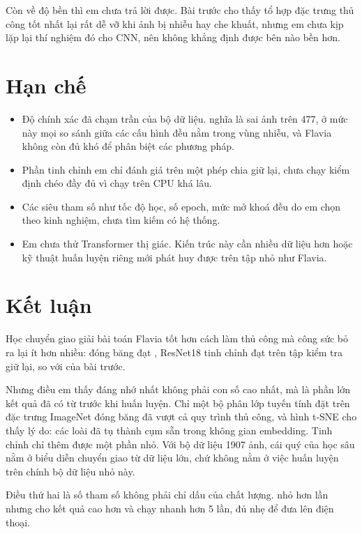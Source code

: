 \documentclass[11pt,a4paper]{article}
\begin{document}
Còn về độ bền thì em chưa trả lời được. Bài trước cho thấy tổ hợp đặc trưng thủ công tốt nhất lại
rất dễ vỡ khi ảnh bị nhiễu hay che khuất, nhưng em chưa kịp lặp lại thí nghiệm đó cho CNN, nên không
khẳng định được bên nào bền hơn.

\section{Hạn chế}

\begin{itemize}
  \item Độ chính xác đã chạm trần của bộ dữ liệu. \ftacc{} nghĩa là sai \fterrors{} ảnh trên 477, ở
        mức này mọi so sánh giữa các cấu hình đều nằm trong vùng nhiễu, và Flavia không còn đủ khó
        để phân biệt các phương pháp.
  \item Phần tinh chỉnh em chỉ đánh giá trên một phép chia giữ lại, chưa chạy kiểm định chéo đầy đủ
        vì chạy trên CPU khá lâu.
  \item Các siêu tham số như tốc độ học, số epoch, mức mở khoá đều do em chọn theo kinh nghiệm, chưa
        tìm kiếm có hệ thống.
  \item Em chưa thử Transformer thị giác. Kiến trúc này cần nhiều dữ liệu hơn hoặc kỹ thuật huấn
        luyện riêng mới phát huy được trên tập nhỏ như Flavia.
\end{itemize}

\section{Kết luận}

Học chuyển giao giải bài toán Flavia tốt hơn cách làm thủ công mà công sức bỏ ra lại ít hơn nhiều:
\probebestname{} đóng băng đạt \probebestcv{}, ResNet18 tinh chỉnh đạt \ftacc{} trên tập kiểm tra
giữ lại, so với \classicalcv{} của bài trước.

Nhưng điều em thấy đáng nhớ nhất không phải con số cao nhất, mà là phần lớn kết quả đã có từ trước
khi huấn luyện. Chỉ một bộ phân lớp tuyến tính đặt trên đặc trưng ImageNet đóng băng đã vượt cả quy
trình thủ công, và hình t-SNE cho thấy lý do: các loài đã tụ thành cụm sẵn trong không gian
embedding. Tinh chỉnh chỉ thêm được một phần nhỏ. Với bộ dữ liệu 1907 ảnh, cái quý của học sâu nằm ở
biểu diễn chuyển giao từ dữ liệu lớn, chứ không nằm ở việc huấn luyện trên chính bộ dữ liệu nhỏ này.

Điều thứ hai là số tham số không phải chỉ dấu của chất lượng. \lightname{} nhỏ hơn \heavyname{}
\paramratio{} lần nhưng cho kết quả cao hơn và chạy nhanh hơn 5 lần, đủ nhẹ để đưa lên điện thoại.
\end{document}
